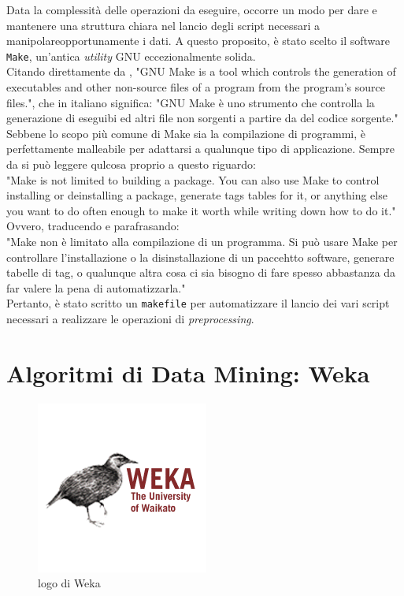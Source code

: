     Data la complessità delle operazioni da eseguire, occorre un modo per dare e mantenere una struttura chiara nel lancio degli script necessari a manipolareopportunamente i dati. A questo proposito, è stato scelto il software \texttt{Make}, un'antica \textit{utility} GNU eccezionalmente solida. \\

    Citando direttamente da \cite{make}, "GNU Make is a tool which controls the generation of executables and other non-source files of a program from the program's source files.", che in italiano significa: "GNU Make è uno strumento che controlla la generazione di eseguibi ed altri file non sorgenti a partire da del codice sorgente."\\

    Sebbene lo scopo più comune di Make sia la compilazione di programmi, è perfettamente malleabile per adattarsi a qualunque tipo di applicazione. Sempre da \cite{make} si può leggere qulcosa proprio a questo riguardo: \\

    "Make is not limited to building a package. You can also use Make to control installing or deinstalling a package, generate tags tables for it, or anything else you want to do often enough to make it worth while writing down how to do it." \\

    Ovvero, traducendo e parafrasando:\\

    "Make non è limitato alla compilazione di un programma. Si può usare Make per controllare l'installazione o la disinstallazione di un paccehtto software, generare tabelle di tag, o qualunque altra cosa ci sia bisogno di fare spesso abbastanza da far valere la pena di automatizzarla." \\

    Pertanto, è stato scritto un \texttt{makefile} per automatizzare il lancio dei vari script necessari a realizzare le operazioni di \textit{preprocessing}.

\section{Algoritmi di Data Mining: Weka}

        \begin{figure}
            \centering
            \caption{logo di Weka}
            \label{weka}
    	    \includegraphics[scale=0.75]{img/weka.png}
        \end{figure}

